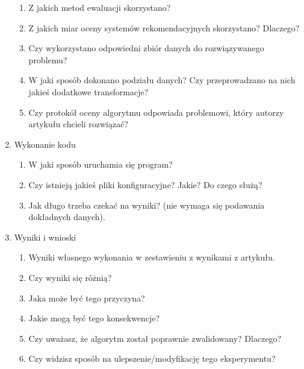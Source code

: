 \documentclass{article}
\begin{document}
\begin{enumerate}
    \begin{enumerate}
        \item Z jakich metod ewaluacji skorzystano?
        \item Z jakich miar oceny systemów rekomendacyjnych skorzystano? Dlaczego?
        \item Czy wykorzystano odpowiedni zbiór danych do rozwiązywanego
        problemu?
        \item W jaki sposób dokonano podziału danych? Czy przeprowadzano na
        nich jakieś dodatkowe transformacje?
        \item Czy protokół oceny algorytmu odpowiada problemowi, który autorzy
        artykułu chcieli rozwiązać?
    \end{enumerate}
    \item Wykonanie kodu
    \begin{enumerate}
        \item W jaki sposób uruchamia się program?
        \item Czy istnieją jakieś pliki konfiguracyjne? Jakie? Do czego służą?
        \item Jak długo trzeba czekać na wyniki? (nie wymaga się podawania
        dokładnych danych).
    \end{enumerate}
    \item Wyniki i wnioski
    \begin{enumerate}
        \item Wyniki własnego wykonania w zestawieniu z wynikami z artykułu.
        \item Czy wyniki się różnią?
        \item Jaka może być tego przyczyna?
        \item Jakie mogą być tego konsekwencje?
        \item Czy uważasz, że algorytm został poprawnie zwalidowany? Dlaczego?
        \item Czy widzisz sposób na ulepszenie/modyfikację tego eksperymentu?
    \end{enumerate}
\end{enumerate}
\end{document}
